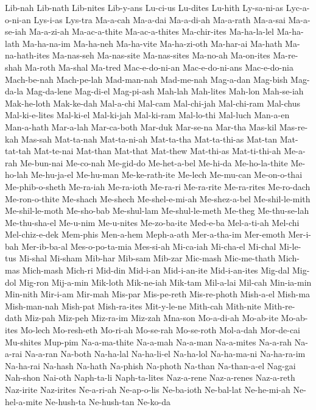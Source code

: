 {  Lib-nah Lib-nath Lib-nites Lib-y-ans Lu-ci-us Lu-dites
  Lu-hith Ly-sa-ni-as Lyc-a-o-ni-an Lys-i-as Lys-tra Ma-a-cah
  Ma-a-dai Ma-a-di-ah Ma-a-rath Ma-a-sai Ma-a-se-iah Ma-a-zi-ah
  Ma-ac-a-thite Ma-ac-a-thites Ma-chir-ites Ma-ha-la-lel Ma-ha-lath Ma-ha-na-im
  Ma-ha-neh Ma-ha-vite Ma-ha-zi-oth Ma-har-ai Ma-hath Ma-na-hath-ites
  Ma-nas-seh Ma-nas-site Ma-nas-sites Ma-no-ah Ma-on-ites Ma-re-shah
  Ma-roth Ma-shal Ma-tred Mac-e-do-ni-an Mac-e-do-ni-ans Mac-e-do-nia
  Mach-be-nah Mach-pe-lah Mad-man-nah Mad-me-nah Mag-a-dan Mag-bish
  Mag-da-la Mag-da-lene Mag-di-el Mag-pi-ash Mah-lah Mah-lites
  Mah-lon Mah-se-iah Mak-he-loth Mak-ke-dah Mal-a-chi Mal-cam
  Mal-chi-jah Mal-chi-ram Mal-chus Mal-ki-e-lites Mal-ki-el Mal-ki-jah
  Mal-ki-ram Mal-lo-thi Mal-luch Man-a-en Man-a-hath Mar-a-lah
  Mar-ca-both Mar-duk Mar-se-na Mar-tha Mas-kil Mas-re-kah
  Mas-sah Mat-ta-nah Mat-ta-ni-ah Mat-ta-tha Mat-ta-thi-as Mat-tan
  Mat-tat-tah Mat-te-nai Mat-than Mat-that Mat-thew Mat-thi-as
  Mat-ti-thi-ah Me-a-rah Me-bun-nai Me-co-nah Me-gid-do Me-het-a-bel
  Me-hi-da Me-ho-la-thite Me-ho-lah Me-hu-ja-el Me-hu-man Me-ke-rath-ite
  Me-lech Me-mu-can Me-on-o-thai Me-phib-o-sheth Me-ra-iah Me-ra-ioth
  Me-ra-ri Me-ra-rite Me-ra-rites Me-ro-dach Me-ron-o-thite Me-shach
  Me-shech Me-shel-e-mi-ah Me-shez-a-bel Me-shil-le-mith Me-shil-le-moth Me-sho-bab
  Me-shul-lam Me-shul-le-meth Me-theg Me-thu-se-lah Me-thu-sha-el Me-u-nim
  Me-u-nites Me-zo-ba-ite Med-e-ba Mel-a-ti-ah Mel-chi Mel-chiz-e-dek
  Mem-phis Men-a-hem Meph-a-ath Mer-a-tha-im Mer-emoth Mer-i-bah
  Mer-ib-ba-al Mes-o-po-ta-mia Mes-si-ah Mi-ca-iah Mi-cha-el Mi-chal
  Mi-le-tus Mi-shal Mi-sham Mib-har Mib-sam Mib-zar
  Mic-mash Mic-me-thath Mich-mas Mich-mash Mich-ri Mid-din
  Mid-i-an Mid-i-an-ite Mid-i-an-ites Mig-dal Mig-dol Mig-ron
  Mij-a-min Mik-loth Mik-ne-iah Mik-tam Mil-a-lai Mil-cah
  Min-ia-min Min-nith Mir-i-am Mir-mah Mis-par Mis-pe-reth
  Mis-re-photh Mish-a-el Mish-ma Mish-man-nah Mish-pat Mish-ra-ites
  Mit-y-le-ne Mith-cah Mith-nite Mith-re-dath Miz-pah Miz-peh
  Miz-ra-im Miz-zah Mna-son Mo-a-di-ah Mo-ab-ite Mo-ab-ites
  Mo-lech Mo-resh-eth Mo-ri-ah Mo-se-rah Mo-se-roth Mol-a-dah
  Mor-de-cai Mu-shites Mup-pim Na-a-ma-thite Na-a-mah Na-a-man
  Na-a-mites Na-a-rah Na-a-rai Na-a-ran Na-both Na-ha-lal
  Na-ha-li-el Na-ha-lol Na-ha-ma-ni Na-ha-ra-im Na-ha-rai Na-hash
  Na-hath Na-phish Na-photh Na-than Na-than-a-el Nag-gai
  Nah-shon Nai-oth Naph-ta-li Naph-ta-lites Naz-a-rene Naz-a-renes
  Naz-a-reth Naz-irite Naz-irites Ne-a-ri-ah Ne-ap-o-lis Ne-ba-ioth
  Ne-bal-lat Ne-he-mi-ah Ne-hel-a-mite Ne-hush-ta Ne-hush-tan Ne-ko-da
}
